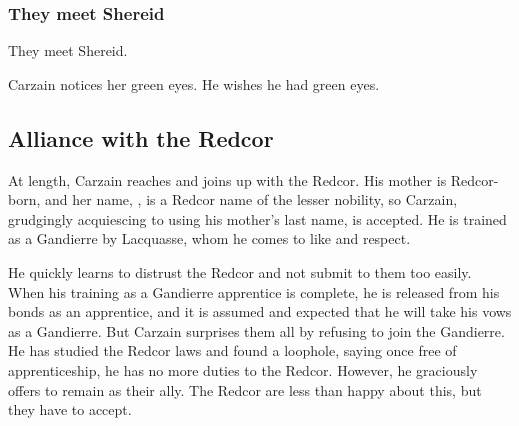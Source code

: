 \begin{garbage}
\subsubsection{They meet Shereid}
They meet Shereid. 

Carzain notices her green eyes. 
He wishes he had green eyes. 









\subsection{Alliance with the Redcor}

At length, Carzain reaches \Redce{} and joins up with the Redcor. His mother is Redcor-born, and her name, \Deracille, is a Redcor name of the lesser nobility, so Carzain, grudgingly acquiescing to using his mother's last name, is accepted. He is trained as a Gandierre by Lacquasse, whom he comes to like and respect. %

He quickly learns to distrust the Redcor and not submit to them too easily. When his training as a Gandierre apprentice is complete, he is released from his bonds as an apprentice, and it is assumed and expected that he will take his vows as a Gandierre. But Carzain surprises them all by refusing to join the Gandierre. He has studied the Redcor laws and found a loophole, saying once free of apprenticeship, he has no more duties to the Redcor. However, he graciously offers to remain as their ally. The Redcor are less than happy about this, but they have to accept. 



\end{garbage}
